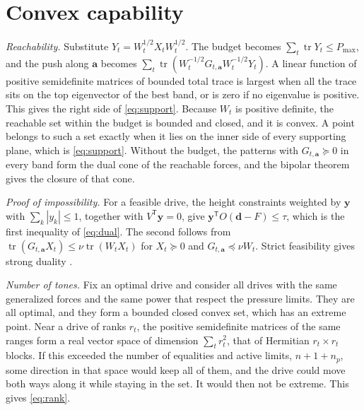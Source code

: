 \documentclass[11pt,a4paper]{article}
\numberwithin{equation}{section}
\DeclareMathOperator{\tr}{tr}
\begin{document}
\section{Convex capability}\label{app:convex}
\emph{Reachability.} Substitute $Y_t=W_t^{1/2}X_tW_t^{1/2}$. The budget becomes
$\sum_t\tr Y_t\le P_{\max}$, and the push along $\bm a$ becomes
$\sum_t\tr(W_t^{-1/2}G_{t,\bm a}W_t^{-1/2}Y_t)$. A linear function of positive
semidefinite matrices of bounded total trace is largest when all the trace sits
on the top eigenvector of the best band, or is zero if no eigenvalue is
positive. This gives the right side of \cref{eq:support}. Because $W_t$ is
positive definite, the reachable set within the budget is bounded and closed,
and it is convex. A point belongs to such a set exactly when it lies on the
inner side of every supporting plane, which is \cref{eq:support}. Without the
budget, the patterns with $G_{t,\bm a}\succeq0$ in every band form the dual cone
of the reachable forces, and the bipolar theorem gives the closure of that cone.

\emph{Proof of impossibility.} For a feasible drive, the height constraints
weighted by $\bm y$ with $\sum_k|y_k|\le1$, together with $V^{\mathsf T}\bm y=0$,
give $\bm y^{\mathsf T}O(\bm d-F)\le\tau$, which is the first inequality of
\cref{eq:dual}. The second follows from $\tr(G_{t,\bm a}X_t)\le\nu\tr(W_tX_t)$
for $X_t\succeq0$ and $G_{t,\bm a}\preceq\nu W_t$. Strict feasibility gives
strong duality \cite{vandenberghe1996}.

\emph{Number of tones.} Fix an optimal drive and consider all drives with the
same generalized forces and the same power that respect the pressure limits.
They are all optimal, and they form a bounded closed convex set, which has an
extreme point. Near a drive of ranks $r_t$, the positive semidefinite matrices
of the same ranges form a real vector space of dimension $\sum_tr_t^2$, that of
Hermitian $r_t\times r_t$ blocks. If this exceeded the number of equalities and
active limits, $n+1+n_p$, some direction in that space would keep all of them,
and the drive could move both ways along it while staying in the set. It would
then not be extreme. This gives \cref{eq:rank}.
\end{document}
